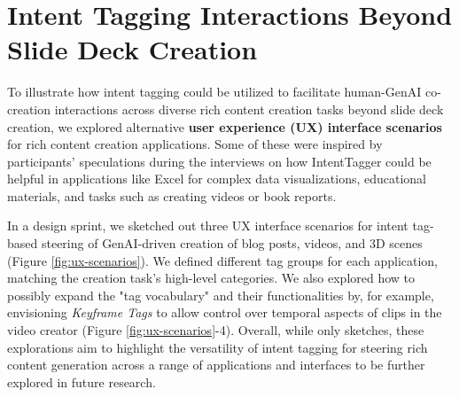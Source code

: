 \section{Intent Tagging Interactions Beyond Slide Deck Creation}

To illustrate how intent tagging could be utilized to facilitate human-GenAI co-creation interactions across diverse rich content creation tasks beyond slide deck creation, we explored alternative \textbf{user experience (UX) interface scenarios} for rich content creation applications. 
Some of these were inspired by participants' speculations during the interviews on how IntentTagger could be helpful in applications like Excel for complex data visualizations, educational materials, and tasks such as creating videos or book reports. 

In a design sprint, we sketched out three UX interface scenarios for intent tag-based steering of GenAI-driven creation of blog posts, videos, and 3D scenes (Figure \ref{fig:ux-scenarios}). 
We defined different tag groups for each application, matching the creation task's high-level categories.  
We also explored how to possibly expand the "tag vocabulary" and their functionalities by, for example, envisioning \textit{Keyframe Tags} to allow control over temporal aspects of clips in the video creator  (Figure \ref{fig:ux-scenarios}-4). 
Overall, while only sketches, these explorations aim to highlight the versatility of intent tagging for steering rich content generation across a range of applications and interfaces to be further explored in future research. 




